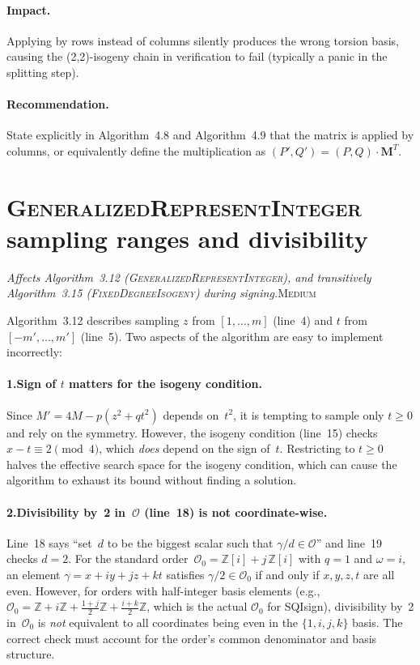 \documentclass[a4paper,11pt]{article}
\newcommand{\algo}[1]{Algorithm~#1}
\newcommand{\medium}{\textsc{\color{RoyalBlue}Medium}}
\newcommand{\finding}[2]{\noindent\textit{#1}\hfill#2\par\smallskip}
\begin{document}
\paragraph{Impact.}
Applying by rows instead of columns silently produces the wrong
torsion basis, causing the (2,2)-isogeny chain in verification to
fail (typically a panic in the splitting step).

\paragraph{Recommendation.}
State explicitly in \algo{4.8} and \algo{4.9} that the matrix is
applied by columns, or equivalently define the multiplication as
$(P', Q') = (P, Q) \cdot \mathbf{M}^T$.

\section{\textsc{GeneralizedRepresentInteger} sampling ranges and
  divisibility}
\label{sec:represent-integer}

\finding{Affects \algo{3.12}
(\textsc{GeneralizedRepresentInteger}), and transitively
\algo{3.15} (\textsc{FixedDegreeIsogeny}) during signing.}{\medium}

\algo{3.12} describes sampling $z$ from $[1, \ldots, m]$ (line~4)
and $t$ from $[-m', \ldots, m']$ (line~5).  Two aspects of the
algorithm are easy to implement incorrectly:

\paragraph{1.\enspace Sign of $t$ matters for the isogeny condition.}
Since $M' = 4M - p(z^2 + qt^2)$ depends on~$t^2$, it is tempting
to sample only $t \geq 0$ and rely on the symmetry.  However, the
isogeny condition (line~15) checks $x - t \equiv 2 \pmod{4}$, which
\emph{does} depend on the sign of~$t$.  Restricting to $t \geq 0$
halves the effective search space for the isogeny condition, which
can cause the algorithm to exhaust its bound without finding a
solution.

\paragraph{2.\enspace Divisibility by~2 in~$\mathcal{O}$
(line~18) is not coordinate-wise.}
Line~18 says ``set~$d$ to be the biggest scalar such that
$\gamma / d \in \mathcal{O}$'' and line~19 checks $d = 2$.
For the standard order~$\mathcal{O}_0 = \mathbb{Z}[i] +
j\,\mathbb{Z}[i]$ with $q = 1$ and $\omega = i$, an element
$\gamma = x + iy + jz + kt$ satisfies $\gamma/2 \in
\mathcal{O}_0$ if and only if $x, y, z, t$ are all even.  However,
for orders with half-integer basis elements (e.g.,
$\mathcal{O}_0 = \mathbb{Z} + i\mathbb{Z} + \frac{1+j}{2}\mathbb{Z}
+ \frac{i+k}{2}\mathbb{Z}$, which is the actual $\mathcal{O}_0$
for SQIsign), divisibility by~2 in~$\mathcal{O}_0$ is
\emph{not} equivalent to all coordinates being even in the
$\{1, i, j, k\}$ basis.  The correct check must account for the
order's common denominator and basis structure.
\end{document}

